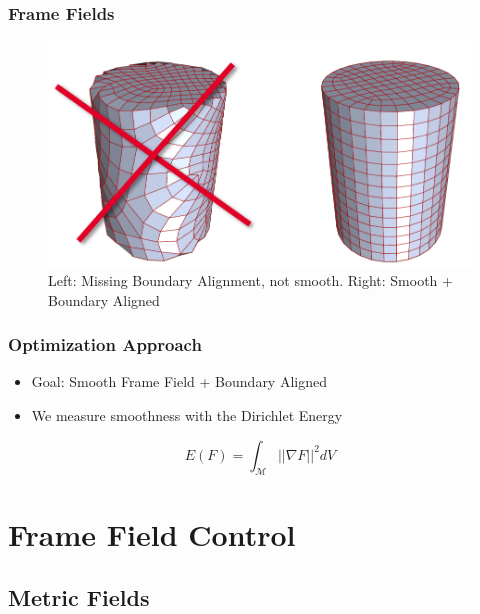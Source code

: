 \documentclass[
	11pt, %
	aspectratio=169, %
]{beamer}
\begin{document}
\begin{frame}
	\frametitle{Frame Fields}
	\begin{figure}
		\includegraphics[width=0.7\linewidth]{requirements.png}
		\caption{Left: Missing Boundary Alignment, not smooth. Right: Smooth + Boundary Aligned \cite{bommes}}
	\end{figure}
\end{frame}

\begin{frame}
	\frametitle{Optimization Approach}
	\begin{itemize}
		\item Goal: Smooth Frame Field + Boundary Aligned
		\item We measure smoothness with the Dirichlet Energy 
	\end{itemize}
	\begin{equation}
		E(F) = \int_\mathcal{M} ||\nabla F||^2dV
	\end{equation}
\end{frame}


\section{Frame Field Control}

\subsection{Metric Fields}
\end{document}
